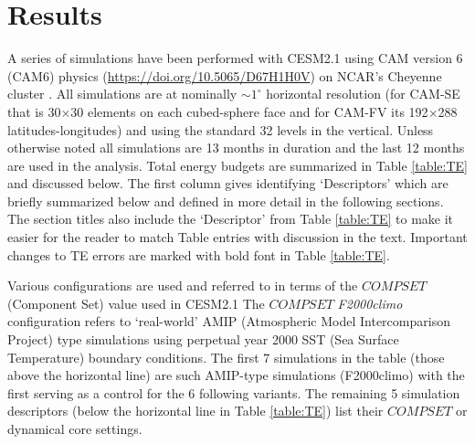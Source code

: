 \documentclass[draft,linenumbers]{agujournal}
\begin{document}
\section{Results}
\label{sec:results}
A series of simulations have been performed with CESM2.1 using CAM version 6 (CAM6) physics (\url{https://doi.org/10.5065/D67H1H0V}) on NCAR's Cheyenne cluster \citep{cheyenne}. All simulations are at nominally $\sim1^{\circ}$ horizontal resolution (for CAM-SE that is 30$\times$30 elements on each cubed-sphere face and for CAM-FV its 192$\times$288 latitudes-longitudes) and using the standard 32 levels in the vertical. Unless otherwise noted all simulations are 13 months in duration and the last 12 months are used in the analysis. Total energy budgets are summarized in Table \ref{table:TE} and discussed below. The first column gives identifying `Descriptors' which are briefly summarized below and defined in more detail in the following sections. The section titles also include the `Descriptor' from Table \ref{table:TE} to make it easier for the reader to match Table entries with discussion in the text. Important changes to TE errors are marked with bold font in Table \ref{table:TE}.

Various configurations are used and referred to in terms of the $COMPSET$ (Component Set) value used in CESM2.1 The $COMPSET$ {\em{F2000climo}} configuration refers to `real-world' AMIP (Atmospheric Model Intercomparison Project) type simulations using perpetual year 2000 SST (Sea Surface Temperature) boundary conditions. The first 7 simulations in the table (those above the horizontal line) are such AMIP-type simulations (F2000climo) with the first serving as a control for the 6 following variants. The remaining 5 simulation descriptors (below the horizontal line in Table \ref{table:TE}) list their $COMPSET$ or dynamical core settings.

{\color{red}{The different configurations listed below (and discussed in separate sub-sections) are chosen to assess TE errors associated with different aspects of the dynamical core numerical algorithm, PDC method, surface conditions, etc. (as pointed out in parenthesis at the end of each item listing):}}
\end{document}
